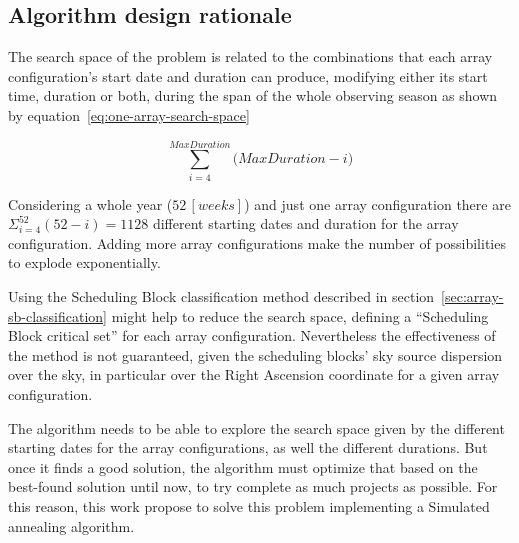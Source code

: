 \subsection{Algorithm design rationale}
\label{sec:acpp-sa-alg-design}
The search space of the problem is related to the combinations that each array configuration's start date and duration can produce, modifying either its start time, duration or both, during the span of the whole observing season as shown by equation~\ref{eq:one-array-search-space}

\begin{equation}
\label{eq:one-array-search-space}
\sum_{i=4}^{MaxDuration} \Big(MaxDuration - i\Big) 
\end{equation}

Considering a whole year ($52\,[weeks]$) and just one array configuration there are $\Sigma_{i=4}^{52} (52 - i) = 1128$ different starting dates and duration for the array configuration. Adding more array configurations make the number of possibilities to explode exponentially.

Using the Scheduling Block classification method described in section~\ref{sec:array-sb-classification} might help to reduce the search space, defining a ``Scheduling Block critical set'' for each array configuration.
Nevertheless the effectiveness of the method is not guaranteed, given the scheduling blocks' sky source dispersion over the sky, in particular over the Right Ascension coordinate for a given array configuration.

The algorithm needs to be able to explore the search space given by the different starting dates for the array configurations, as well the different durations. But once it finds a good solution, the algorithm must optimize that based on the best-found solution until now, to try complete as much projects as possible. For this reason, this work propose to solve this problem implementing a Simulated annealing algorithm.

